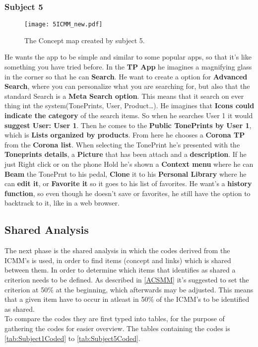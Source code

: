 \subsubsection{Subject 5}
\label{Subject5ICMM}
\begin{figure}[H]
	\centering
	\texttt{[image: 5ICMM\_new.pdf]}
	\caption{The Concept map created by subject 5.}
	\label{fig:ICMM5}
\end{figure}

He wants the app to be simple and similar to some popular apps, so that it’s like something you have tried before. In the \textbf{TP App} he imagines a magnifying glass in the corner so that he can \textbf{Search}. He want to create a option for \textbf{Advanced Search}, where you can personalize what you are searching for, but also that the standard Search is a \textbf{Meta Search option}. This means that it search on ever thing int the system(TonePrints, User, Product…). He imagines that \textbf{Icons could indicate the category} of the search items. So when he searches User 1 it would \textbf{suggest User: User 1}. Then he comes to the \textbf{Public TonePrints by User 1}, which is \textbf{Lists organized by products}. From here he chooses a \textbf{Corona TP} from the \textbf{Corona list}. When selecting the TonePrint he’s presented with the \textbf{Toneprints details}, a \textbf{Picture} that has been attach and a \textbf{description}. If he just Right click or on the phone Hold he’s shown a \textbf{Context menu} where he can \textbf{Beam} the TonePrnt to his pedal, \textbf{Clone} it to his \textbf{Personal Library} where he can \textbf{edit it}, or \textbf{Favorite it} so it goes to his list of favorites. He want’s a \textbf{history function}, so even though he doesn’t save or favorites, he still have the option to backtrack to it, like in a web browser. 

\subsection{Shared Analysis}
\label{SharedAnalysis}
%
The next phase is the shared analysis in which the codes derived from the ICMM's is used, in order to find items (concept and links) which is shared between them. In order to determine which items that identifies as shared a criterion needs to be defined. As described in \autoref{ACSMM} it's suggested to set the criterion at 50\% at the beginning, which afterwards may be adjusted. This means that a given item have to occur in atleast in 50\% of the ICMM's to be identified as shared.\\
To compare the codes they are first typed into tables, for the purpose of gathering the codes for easier overview. The tables containing the codes is \autoref{tab:Subject1Coded} to \autoref{tab:Subject5Coded}. 


